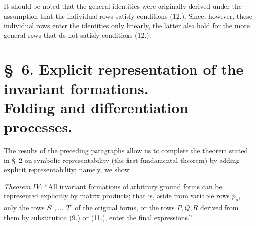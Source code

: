 \documentclass[11pt]{article}
\begin{document}
It should be noted that the general identities were originally derived under the assumption that the individual rows satisfy conditions (12.). Since, however, these individual rows enter the identities only linearly, the latter also hold for the more general rows that do not satisfy conditions (12.).

\section*{\S\ 6. Explicit representation of the invariant formations.\\Folding and differentiation processes.}
The results of the preceding paragraphs allow us to complete the theorem stated in \S\ 2 on symbolic representability (the first fundamental theorem) by adding explicit representability; namely, we show:

\emph{Theorem IV:} ``All invariant formations of arbitrary ground forms can be represented explicitly by matrix products; that is, aside from variable rows $p_\rho$, only the rows $S^\sigma,\ldots,T^\tau$ of the original forms, or the rows $P,Q,R$ derived from them by substitution (9.) or (11.), enter the final expressions.''
\end{document}
